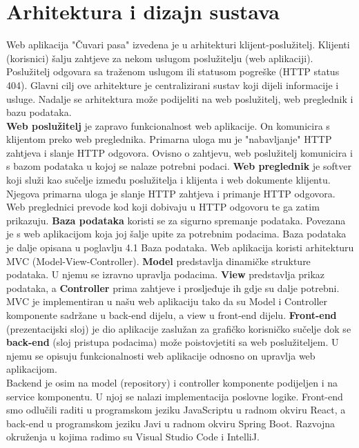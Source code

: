 \chapter{Arhitektura i dizajn sustava}

		Web aplikacija "Čuvari pasa" izvedena je u arhitekturi klijent-poslužitelj. Klijenti (korisnici) šalju zahtjeve za nekom uslugom poslužitelju (web aplikaciji). Poslužitelj odgovara sa traženom uslugom ili statusom pogreške (HTTP status 404). Glavni cilj ove arhitekture je centralizirani sustav koji dijeli informacije i usluge.
		Nadalje se arhitektura može podijeliti na web poslužitelj, web preglednik i bazu podataka.\\
		\newline
		\textbf{Web poslužitelj} je zapravo funkcionalnost web aplikacije. On komunicira s klijentom preko web preglednika. Primarna uloga mu je "nabavljanje" HTTP zahtjeva i slanje HTTP odgovora. Ovisno o zahtjevu, web poslužitelj komunicira i s bazom podataka u kojoj se nalaze potrebni podaci. 
		\newline
		\textbf{Web preglednik} je softver koji služi kao sučelje između poslužitelja i klijenta i web dokumente klijentu. Njegova primarna uloga je slanje HTTP zahtjeva i primanje HTTP odgovora. Web preglednici prevode kod koji dobivaju u HTTP odgovoru te ga zatim prikazuju.
		\newline
		\textbf{Baza podataka} koristi se za sigurno spremanje podataka. Povezana je s web aplikacijom koja joj šalje upite za potrebnim podacima. Baza podataka je dalje opisana u poglavlju 4.1 Baza podataka.
		\newline
		\newline
		Web aplikacija koristi arhitekturu MVC (Model-View-Controller). \textbf{Model} predstavlja dinamičke strukture podataka. U njemu se izravno upravlja podacima.
		\textbf{View} predstavlja prikaz podataka, a \textbf{Controller} prima zahtjeve i prosljeđuje ih gdje su dalje potrebni. MVC je implementiran u našu web aplikaciju tako da su Model i Controller komponente sadržane u back-end dijelu, a view u front-end dijelu. \textbf{Front-end} (prezentacijski sloj) je dio aplikacije zaslužan za grafičko korisničko sučelje dok se \textbf{back-end} (sloj pristupa podacima) može poistovjetiti sa web poslužiteljem. U njemu se opisuju funkcionalnosti web aplikacije odnosno on upravlja web aplikacijom.\\
		Backend je osim na model (repository) i controller komponente podijeljen i na service komponentu. U njoj se nalazi implementacija poslovne logike.
		\newline
		Front-end smo odlučili raditi u programskom jeziku JavaScriptu u radnom okviru React, a back-end u programskom jeziku Javi u radnom okviru Spring Boot. Razvojna okruženja u kojima radimo su Visual Studio Code i IntelliJ.
		
